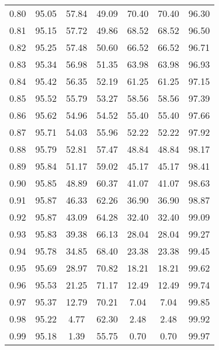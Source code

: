 \begin{tabular}{|c|c|c|c|c|c|c|}
      0.80 &     95.05 &     57.84 &      49.09 &   70.40 &      70.40 &         96.30 \\
      0.81 &     95.15 &     57.72 &      49.86 &   68.52 &      68.52 &         96.50 \\
      0.82 &     95.25 &     57.48 &      50.60 &   66.52 &      66.52 &         96.71 \\
      0.83 &     95.34 &     56.98 &      51.35 &   63.98 &      63.98 &         96.93 \\
      0.84 &     95.42 &     56.35 &      52.19 &   61.25 &      61.25 &         97.15 \\
      0.85 &     95.52 &     55.79 &      53.27 &   58.56 &      58.56 &         97.39 \\
      0.86 &     95.62 &     54.96 &      54.52 &   55.40 &      55.40 &         97.66 \\
      0.87 &     95.71 &     54.03 &      55.96 &   52.22 &      52.22 &         97.92 \\
      0.88 &     95.79 &     52.81 &      57.47 &   48.84 &      48.84 &         98.17 \\
      0.89 &     95.84 &     51.17 &      59.02 &   45.17 &      45.17 &         98.41 \\
      0.90 &     95.85 &     48.89 &      60.37 &   41.07 &      41.07 &         98.63 \\
      0.91 &     95.87 &     46.33 &      62.26 &   36.90 &      36.90 &         98.87 \\
      0.92 &     95.87 &     43.09 &      64.28 &   32.40 &      32.40 &         99.09 \\
      0.93 &     95.83 &     39.38 &      66.13 &   28.04 &      28.04 &         99.27 \\
      0.94 &     95.78 &     34.85 &      68.40 &   23.38 &      23.38 &         99.45 \\
      0.95 &     95.69 &     28.97 &      70.82 &   18.21 &      18.21 &         99.62 \\
      0.96 &     95.53 &     21.25 &      71.17 &   12.49 &      12.49 &         99.74 \\
      0.97 &     95.37 &     12.79 &      70.21 &    7.04 &       7.04 &         99.85 \\
      0.98 &     95.22 &      4.77 &      62.30 &    2.48 &       2.48 &         99.92 \\
      0.99 &     95.18 &      1.39 &      55.75 &    0.70 &       0.70 &         99.97 \\
\bottomrule
\end{tabular}
